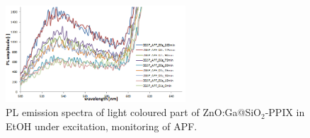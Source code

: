     \begin{figure}
        \centering
        \includegraphics[width=0.6\textwidth]{pictures/apf_zgsp_fair_vyrez_new_holder.PNG}
        \caption{PL emission spectra of light coloured part of ZnO:Ga@SiO$_{2}$-PPIX in EtOH under  excitation, monitoring of APF.}
        \label{fig:apf_zgsp_fair_vyrez_new_holder}
    \end{figure}
    